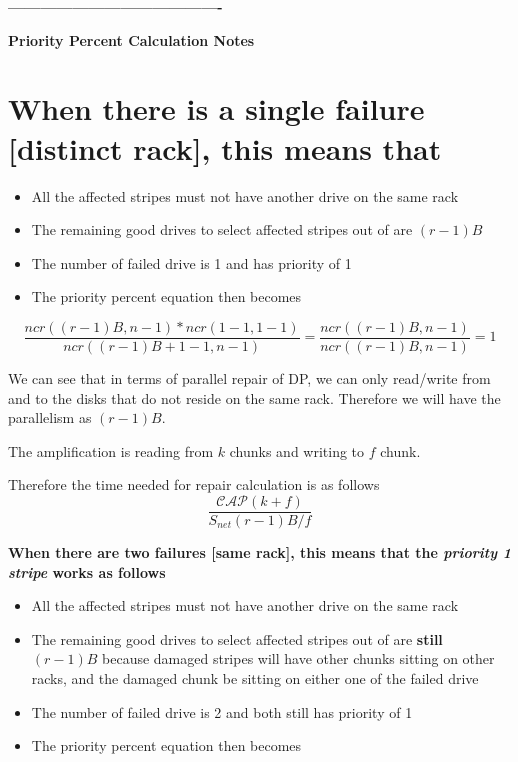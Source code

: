 \documentclass[journal]{IEEEtran}
\begin{document}
\textbf{----------------------------------------}

\textbf{Priority Percent Calculation Notes}


\section{When there is a single failure [distinct rack], this means that}
\begin{itemize}
  \item All the affected stripes must not have another drive on the same rack
  \item The remaining good drives to select affected stripes out of are $(r-1)B$
  \item The number of failed drive is 1 and has priority of 1
  \item The priority percent equation then becomes
\end{itemize}

\begin{equation*}
  \frac{ncr((r-1)B, n-1)*ncr(1-1, 1-1)}{ncr((r-1)B+1-1, n-1)}=\frac{ncr((r-1)B, n-1)}{ncr((r-1)B, n-1)}=1
\end{equation*}

We can see that in terms of parallel repair of DP, we can only read/write from and to the disks that do not reside on the same rack. Therefore we will have the parallelism as $(r-1)B$. 

The amplification is reading from $k$ chunks and writing to $f$ chunk.

Therefore the time needed for repair calculation is as follows
\begin{equation*}
  \frac{\mathcal{CAP}(k+f)}{S_{net}(r-1)B/f}
\end{equation*}

\textbf{When there are two failures [same rack], this means that the \textit{priority 1 stripe} works as follows}
\begin{itemize}
  \item All the affected stripes must not have another drive on the same rack
  \item The remaining good drives to select affected stripes out of are \textbf{still} $(r-1)B$ because damaged stripes will have other chunks sitting on other racks, and the damaged chunk be sitting on either one of the failed drive
  \item The number of failed drive is 2 and both still has priority of 1
  \item The priority percent equation then becomes
\end{itemize}
\end{document}
